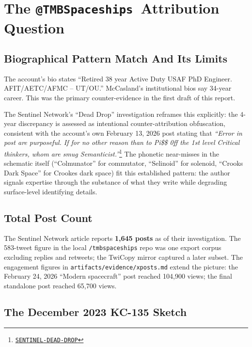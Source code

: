 \documentclass[11pt]{article}
\makeatletter
\newcommand{\account}{\texttt{@TMBSpaceships}}
\newcommand{\src}[2]{\href{#1}{\texttt{#2}}}
\makeatother
\begin{document}
\section{The \account\ Attribution Question}

\subsection{Biographical Pattern Match And Its Limits}

The account's bio states ``Retired 38 year Active Duty USAF PhD Engineer. AFIT/AETC/AFMC -- UT/OU.'' McCasland's institutional bios say 34-year career. This was the primary counter-evidence in the first draft of this report.

The Sentinel Network's ``Dead Drop'' investigation reframes this explicitly: the 4-year discrepancy is assessed as intentional counter-attribution obfuscation, consistent with the account's own February 13, 2026 post stating that \emph{``Error in post are purposeful. If for no other reason than to Pi\$\$ 0ff the 1st level Critical thinkers, whom are smug Semanticist.''}\footnote{\src{https://thesentinel.network/p/the-dead-drop-an-anonymous-x-account}{SENTINEL-DEAD-DROP}} The phonetic near-misses in the schematic itself (``Colmunator'' for commutator, ``Selinoid'' for solenoid, ``Crooks Dark Space'' for Crookes dark space) fit this established pattern: the author signals expertise through the substance of what they write while degrading surface-level identifying details.

\subsection{Total Post Count}

The Sentinel Network article reports \textbf{1{,}645 posts} as of their investigation. The 583-tweet figure in the local \texttt{/tmbspaceships} repo was one export corpus excluding replies and retweets; the TwiCopy mirror captured a later subset. The engagement figures in \texttt{artifacts/evidence/xposts.md} extend the picture: the February 24, 2026 ``Modern spacecraft'' post reached 104{,}900 views; the final standalone post reached 65{,}700 views.

\subsection{The December 2023 KC-135 Sketch}
\end{document}
